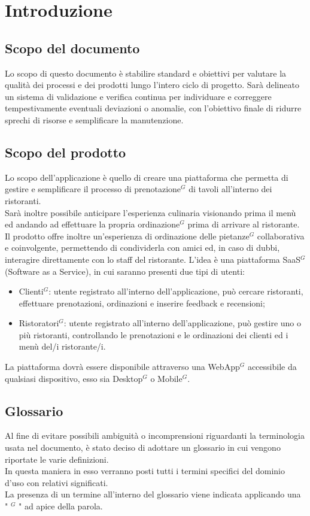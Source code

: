 
\section{Introduzione}
\subsection{Scopo del documento}
Lo scopo di questo documento è stabilire standard e obiettivi per valutare la qualità
dei processi e dei prodotti lungo l'intero ciclo di progetto. Sarà delineato un sistema
di validazione e verifica continua per individuare e correggere tempestivamente
eventuali deviazioni o anomalie, con l'obiettivo finale di ridurre sprechi di risorse e
semplificare la manutenzione.
\subsection{Scopo del prodotto}
Lo scopo dell'applicazione è quello di creare una piattaforma che permetta di gestire e semplificare
il processo di prenotazione$^{G}$ di tavoli all'interno dei ristoranti. \\
Sarà inoltre possibile anticipare l'esperienza culinaria visionando prima il menù ed 
andando ad effettuare la propria ordinazione$^{G}$ prima di arrivare al ristorante. \\
Il prodotto offre inoltre un’esperienza di ordinazione delle pietanze$^{G}$ collaborativa e coinvolgente, 
permettendo di condividerla con amici ed, in caso di dubbi, interagire direttamente con lo staff del ristorante.
L’idea è una piattaforma SaaS$^{G}$ (Software as a Service), in cui saranno presenti due tipi di utenti:
\begin{itemize}
    \item Clienti$^{G}$: utente registrato all’interno dell’applicazione, può cercare ristoranti, effettuare prenotazioni, ordinazioni e inserire feedback e recensioni;
    \item Ristoratori$^{G}$: utente registrato all’interno dell’applicazione, può gestire uno o più ristoranti, controllando le prenotazioni e le ordinazioni dei clienti ed i menù del/i ristorante/i.
\end{itemize}
La piattaforma dovrà essere  disponibile attraverso una WebApp$^{G}$ accessibile da qualsiasi dispositivo, esso sia Desktop$^{G}$ o Mobile$^{G}$.
\subsection{Glossario}
Al fine di evitare possibili ambiguità o incomprensioni riguardanti la terminologia usata nel documento, è stato deciso di adottare un glossario in cui vengono riportate le varie definizioni.  \\
In questa maniera in esso verranno posti tutti i termini specifici del dominio d’uso con relativi significati. \\
La presenza di un termine all’interno del glossario viene indicata applicando una " $^{G}$ " ad apice della parola.
